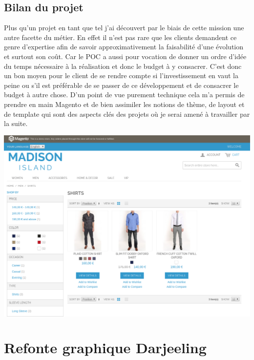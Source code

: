 \documentclass[a4paper,11pt,twoside]{report}
\begin{document}
    \subsection*{Bilan du projet}
    Plus qu'un projet en tant que tel j'ai découvert par le biais de cette mission une autre facette du métier. En effet il n'est pas rare que les clients demandent ce genre d'expertise afin de savoir approximativement la faisabilité d'une évolution et surtout son coût. Car le POC a aussi pour vocation de donner un ordre d'idée du temps nécessaire à la réalisation et donc le budget à y consacrer. C'est donc un bon moyen pour le client de se rendre compte si l'investissement en vaut la peine ou s'il est préférable de se passer de ce développement et de consacrer le budget à autre chose. D'un point de vue purement technique cela m'a permis de prendre en main Magento et de bien assimiler les notions de thème, de layout et de template qui sont des aspects clés des projets où je serai amené à travailler par la suite. 
    \begin{center}
      \includegraphics[width=\textwidth]{images/new_responsive_magento_theme.png} 
      \label{responsive_theme_magento}
    \end{center}

    \newpage
    
  \section{Refonte graphique Darjeeling}
\end{document}
